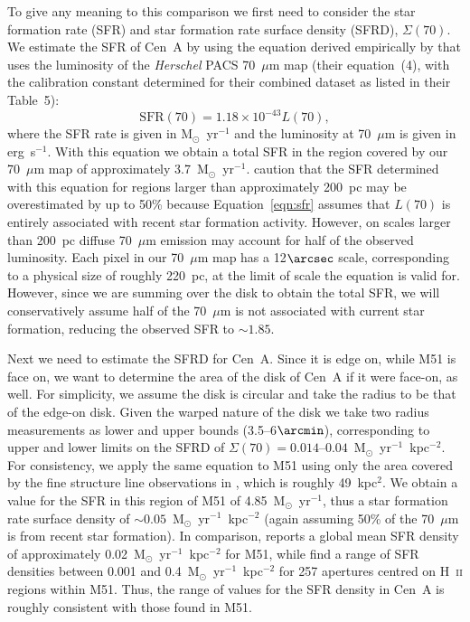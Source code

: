 \documentclass[preprint2]{aastex}
\begin{document}
To give any meaning to this comparison we first need to consider the star formation rate (SFR) and star formation rate surface density (SFRD), $\Sigma(70)$.  We estimate the SFR of Cen~A by using the equation derived empirically by \citet{2013ApJ...768..180L} that uses the luminosity of the \emph{Herschel} PACS 70~$\mu$m map (their equation~(4), with the calibration constant determined for their combined dataset as listed in their Table~5):
\begin{equation}\label{eqn:sfr}
\mathrm{SFR}(70) = 1.18 \times 10^{-43} L(70),
\end{equation}
where the SFR rate is given in M$_{\odot}$~yr$^{-1}$ and the luminosity at 70~$\mu$m is given in erg~s$^{-1}$.  With this equation we obtain a total SFR in the region covered by our 70~$\mu$m map of approximately 3.7~M$_{\odot}$~yr$^{-1}$.   \citet{2013ApJ...768..180L} caution that the SFR determined with this equation for regions larger than approximately 200~pc may be overestimated by up to 50\% because Equation~\ref{eqn:sfr} assumes that $L(70)$ is entirely associated with recent star formation activity.  However, on scales larger than 200~pc diffuse 70~$\mu$m emission may account for half of the observed luminosity.  Each pixel in our 70~$\mu$m map has a 12$\arcsec$ scale, corresponding to a physical size of roughly 220~pc, at the limit of scale the equation is valid for.  However, since we are summing over the disk to obtain the total SFR, we will conservatively assume half of the 70~$\mu$m is not associated with current star formation, reducing the observed SFR to $\sim1.85$.

Next we need to estimate the SFRD for Cen~A.  Since it is edge on, while M51 is face on, we want to determine the area of the disk of Cen~A if it were face-on, as well.  For simplicity, we assume the disk is circular and take the radius to be that of the edge-on disk.  Given the warped nature of the disk we take two radius measurements as lower and upper bounds (3.5--6$\arcmin$), corresponding to upper and lower limits on the SFRD of $\Sigma(70) = 0.014$--$0.04$~M$_{\odot}$~yr$^{-1}$~kpc$^{-2}$.  For consistency, we apply the same equation to M51 using only the area covered by the fine structure line observations in \citet{parkin_2013}, which is roughly 49~kpc$^{2}$.  We obtain a value for the SFR in this region of M51 of 4.85~M$_{\odot}$~yr$^{-1}$, thus a star formation rate surface density of $\sim 0.05$~M$_{\odot}$~yr$^{-1}$~kpc$^{-2}$ (again assuming 50\% of the 70~$\mu$m is from recent star formation).   In comparison, \citet{1998ApJ...498..541K} reports a global mean SFR density of approximately 0.02~M$_{\odot}$~yr$^{-1}$~kpc$^{-2}$ for M51, while \citet{2007ApJ...671..333K} find a range of SFR densities between 0.001 and 0.4~M$_{\odot}$~yr$^{-1}$~kpc$^{-2}$ for 257 apertures centred on H~\textsc{ii} regions within M51.  Thus, the range of values for the SFR density in Cen~A is roughly consistent with those found in M51.
\end{document}
